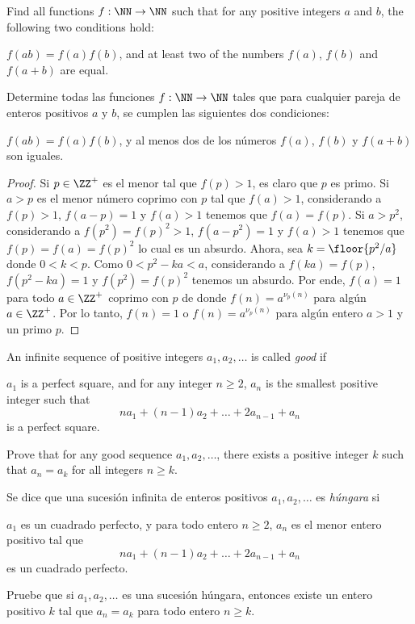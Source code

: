 \begin{probMG}[EGMO 2022/2]
	Find all functions $f:\NN\to\NN$ such that for any positive integers $a$ and $b$, the following two conditions hold:
	\begin{enumerate}[(1)]
		\ii $f(ab)=f(a)f(b)$, and
		\ii at least two of the numbers $f(a)$, $f(b)$ and $f(a+b)$ are equal.
	\end{enumerate}
	\begin{probSP}
		Determine todas las funciones $f:\NN\to\NN$ tales que para cualquier pareja de enteros positivos $a$ y $b$, se cumplen las siguientes dos condiciones:
		\begin{enumerate}[(1)]
			\ii $f(ab)=f(a)f(b)$, y
			\ii al menos dos de los números $f(a)$, $f(b)$ y $f(a+b)$ son iguales.
		\end{enumerate}
	\end{probSP}
\end{probMG}

\begin{proof}
	Si $p\in\ZZ^+$ es el menor tal que $f(p)>1$, es claro que $p$ es primo. Si $a>p$ es el menor número coprimo con $p$ tal que $f(a)>1$, considerando a $f(p)>1$, $f(a-p)=1$ y $f(a)>1$ tenemos que $f(a)=f(p)$. Si $a>p^2$, considerando a $f(p^2)=f(p)^2>1$, $f(a-p^2)=1$ y $f(a)>1$ tenemos que $f(p)=f(a)=f(p)^2$ lo cual es un absurdo. Ahora, sea $k=\floor{p^2/a}$ donde $0<k<p$. Como $0<p^2-ka<a$, considerando a $f(ka)=f(p)$, $f(p^2-ka)=1$ y $f(p^2)=f(p)^2$ tenemos un absurdo. Por ende, $f(a)=1$ para todo $a\in\ZZ^+$ coprimo con $p$ de donde $f(n)=a^{\nu_p(n)}$ para algún $a\in\ZZ^+$. Por lo tanto, $f(n)=1$ o $f(n)=a^{\nu_p(n)}$ para algún entero $a>1$ y un primo $p$.
\end{proof}

\begin{probEG}[EGMO 2022/3]
	An infinite sequence of positive integers $a_1,a_2,\dots$ is called \emph{good} if
	\begin{enumerate}[(1)]
		\ii $a_1$ is a perfect square, and
		\ii for any integer $n\ge 2$, $a_n$ is the smallest positive integer such that
		\[na_1+(n-1)a_2+\dots+2a_{n-1}+a_n\]
		is a perfect square.
	\end{enumerate}
	Prove that for any good sequence $a_1,a_2,\dots$, there exists a positive integer $k$ such that $a_n=a_k$ for all integers $n\ge k$.
	\begin{probSP}
		Se dice que una sucesión infinita de enteros positivos $a_1,a_2,\dots$ es \emph{húngara} si
		\begin{enumerate}[(1)]
			\ii $a_1$ es un cuadrado perfecto, y
			\ii para todo entero $n\ge 2$, $a_n$ es el menor entero positivo tal que
			\[na_1+(n-1)a_2+\dots+2a_{n-1}+a_n\]
			es un cuadrado perfecto.
		\end{enumerate}
		Pruebe que si $a_1,a_2,\dots$ es una sucesión húngara, entonces existe un entero positivo $k$ tal que $a_n=a_k$ para todo entero $n\ge k$.
	\end{probSP}
\end{probEG}

